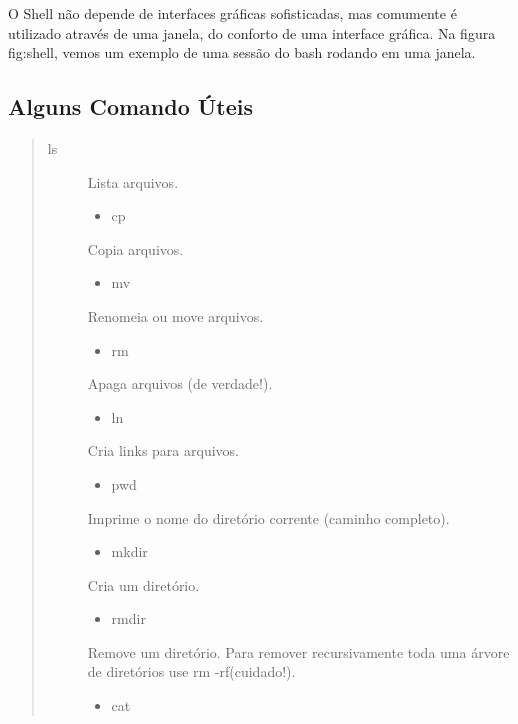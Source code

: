 \documentclass[a4paper,10pt,brazil]{sphinxmanual}
\begin{document}
O Shell não depende de interfaces gráficas sofisticadas, mas
comumente é utilizado através de uma janela, do conforto de uma
interface gráfica. Na figura fig:shell, vemos um exemplo de uma
sessão do bash rodando em uma janela.


\subsection{Alguns Comando Úteis}
\label{bash:alguns-comando-uteis}\begin{quote}
\begin{description}
\item[{ls}] \leavevmode
Lista arquivos.
\begin{itemize}
\item {} 
cp

\end{itemize}

Copia arquivos.
\begin{itemize}
\item {} 
mv

\end{itemize}

Renomeia ou move arquivos.
\begin{itemize}
\item {} 
rm

\end{itemize}

Apaga arquivos (de verdade!).
\begin{itemize}
\item {} 
ln

\end{itemize}

Cria links para arquivos.
\begin{itemize}
\item {} 
pwd

\end{itemize}

Imprime o nome do diretório corrente (caminho completo).
\begin{itemize}
\item {} 
mkdir

\end{itemize}

Cria um diretório.
\begin{itemize}
\item {} 
rmdir

\end{itemize}

Remove um diretório. Para remover recursivamente toda uma
árvore de diretórios use rm -rf(cuidado!).
\begin{itemize}
\item {} 
cat


\end{itemize}
\end{description}
\end{quote}
\end{document}
